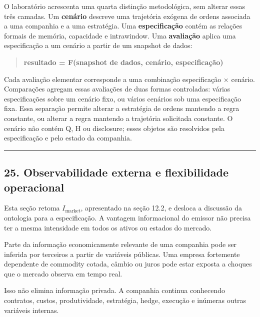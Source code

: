 \documentclass[
  a4paper,
]{article}
\begin{document}
O laboratório acrescenta uma quarta distinção metodológica, sem alterar
essas três camadas. Um \textbf{cenário} descreve uma trajetória exógena
de ordens associada a uma companhia e a uma estratégia. Uma
\textbf{especificação} contém as relações formais de memória, capacidade
e intrawindow. Uma \textbf{avaliação} aplica uma especificação a um
cenário a partir de um snapshot de dados:

\begin{quote}
\textbf{resultado = F(snapshot de dados, cenário, especificação)}
\end{quote}

Cada avaliação elementar corresponde a uma combinação especificação ×
cenário. Comparações agregam essas avaliações de duas formas
controladas: várias especificações sobre um cenário fixo, ou vários
cenários sob uma especificação fixa. Essa separação permite alterar a
estratégia de ordens mantendo a regra constante, ou alterar a regra
mantendo a trajetória solicitada constante. O cenário não contém Q, H ou
disclosure; esses objetos são resolvidos pela especificação e pelo
estado da companhia.

\begin{center}\rule{0.5\linewidth}{0.5pt}\end{center}

\hypertarget{25-observabilidade-externa-e-flexibilidade-operacional}{}

\hypertarget{25-observabilidade-externa-e-flexibilidade-operacional}{%
\subsection{25. Observabilidade externa e flexibilidade
operacional}\label{25-observabilidade-externa-e-flexibilidade-operacional}}

Esta seção retoma \(I_{\mathrm{market}}\), apresentado na seção 12.2, e
desloca a discussão da ontologia para a especificação. A vantagem
informacional do emissor não precisa ter a mesma intensidade em todos os
ativos ou estados do mercado.

Parte da informação economicamente relevante de uma companhia pode ser
inferida por terceiros a partir de variáveis públicas. Uma empresa
fortemente dependente de commodity cotada, câmbio ou juros pode estar
exposta a choques que o mercado observa em tempo real.

Isso não elimina informação privada. A companhia continua conhecendo
contratos, custos, produtividade, estratégia, hedge, execução e inúmeras
outras variáveis internas.
\end{document}
